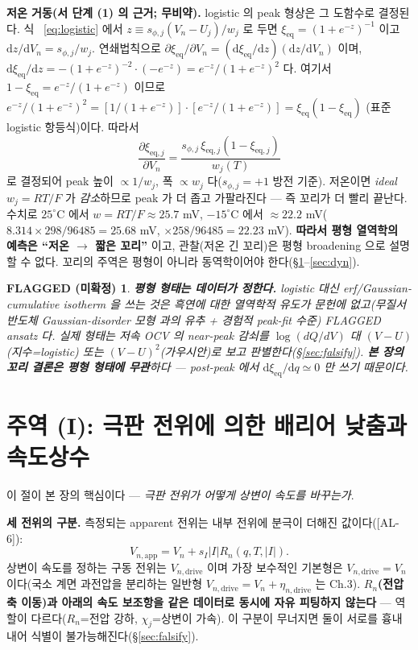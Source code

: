 \documentclass[11pt,a4paper]{article}
\newtheorem*{flagbox}{FLAGGED (미확정)}
\newcommand{\dd}{\mathrm{d}}
\newcommand{\eq}{\mathrm{eq}}
\newcommand{\app}{\mathrm{app}}
\newcommand{\drive}{\mathrm{drive}}
\newcommand{\AL}[1]{\textsf{[AL-#1]}}
\begin{document}
\textbf{저온 거동(서 단계 (1) 의 근거; 무비약).} logistic 의 peak 형상은 그 도함수로 결정된다. 식~
\eqref{eq:logistic} 에서 $z\equiv s_{\phi,j}(V_n-U_j)/w_j$ 로 두면 $\xi_\eq=(1+e^{-z})^{-1}$ 이고
$\dd z/\dd V_n=s_{\phi,j}/w_j$. 연쇄법칙으로 $\partial\xi_\eq/\partial V_n=(\dd\xi_\eq/\dd z)(\dd z/\dd V_n)$
이며, $\dd\xi_\eq/\dd z=-(1+e^{-z})^{-2}\cdot(-e^{-z})=e^{-z}/(1+e^{-z})^2$ 다. 여기서
$1-\xi_\eq=e^{-z}/(1+e^{-z})$ 이므로 $e^{-z}/(1+e^{-z})^2=[1/(1+e^{-z})]\cdot[e^{-z}/(1+e^{-z})]
=\xi_\eq(1-\xi_\eq)$ (표준 logistic 항등식)이다. 따라서
\begin{equation}
\frac{\partial\xi_{\eq,j}}{\partial V_n}=\frac{s_{\phi,j}\,\xi_{\eq,j}(1-\xi_{\eq,j})}{w_j(T)}
\label{eq:dxidV}
\end{equation}
로 결정되어 peak 높이 $\propto 1/w_j$, 폭 $\propto w_j$ 다($s_{\phi,j}=+1$ 방전 기준). 저온이면 \emph{ideal}
$w_j=RT/F$ 가 \emph{감소}하므로
peak 가 더 좁고 가팔라진다 — 즉 꼬리가 더 빨리 끝난다. 수치로 $25^\circ$C 에서 $w=RT/F\approx25.7$ mV,
$-15^\circ$C 에서 $\approx22.2$ mV($8.314\times298/96485=25.68$ mV, $\times258/96485=22.23$ mV).
\textbf{따라서 평형 열역학의 예측은 ``저온 $\to$ 짧은 꼬리''} 이고, 관찰(저온 긴 꼬리)은 평형 broadening 으로
설명할 수 없다. 꼬리의 주역은 평형이 아니라 동역학이어야 한다(\S\ref{sec:rate}--\ref{sec:dyn}).
\begin{flagbox}
\textbf{평형 형태는 데이터가 정한다.} logistic 대신 erf/Gaussian-cumulative isotherm 을 쓰는 것은 흑연에
대한 열역학적 유도가 문헌에 없고(무질서 반도체 Gaussian-disorder 모형 \cite{baessler1993} 과의 유추 +
경험적 peak-fit 수준) FLAGGED ansatz 다. 실제 형태는 저속 OCV 의 near-peak 감쇠를 $\log(dQ/dV)$ 대
$(V-U)$(지수=logistic) 또는 $(V-U)^2$(가우시안)로 보고 판별한다(\S\ref{sec:falsify}). \textbf{본 장의
꼬리 결론은 평형 형태에 무관}하다 — post-peak 에서 $\dd\xi_\eq/\dd q\simeq0$ 만 쓰기 때문이다.
\end{flagbox}

\section{주역 (I): 극판 전위에 의한 배리어 낮춤과 속도상수}\label{sec:rate}
이 절이 본 장의 핵심이다 — \emph{극판 전위가 어떻게 상변이 속도를 바꾸는가}.

\textbf{세 전위의 구분.} 측정되는 apparent 전위는 내부 전위에 분극이 더해진 값이다(\AL{6}):
\begin{equation}
V_{n,\app}=V_n+s_I|I|R_n(q,T,|I|).
\label{eq:Vapp}
\end{equation}
상변이 속도를 정하는 구동 전위는 $V_{n,\drive}$ 이며 가장 보수적인 기본형은 $V_{n,\drive}=V_n$ 이다(국소
계면 과전압을 분리하는 일반형 $V_{n,\drive}=V_n+\eta_{n,\drive}$ 는 Ch.3). \textbf{$R_n$(전압축 이동)과
아래의 속도 보조항을 같은 데이터로 동시에 자유 피팅하지 않는다} — 역할이 다르다($R_n$=전압 강하,
$\chi_j$=상변이 가속). 이 구분이 무너지면 둘이 서로를 흉내 내어 식별이 불가능해진다(\S\ref{sec:falsify}).
\end{document}
